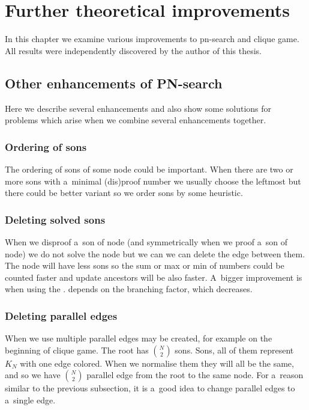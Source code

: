 \chapter{Further theoretical improvements}

In this chapter we examine various improvements to pn-search and clique
game. All results
were independently discovered by the author of this thesis.

\section{Other enhancements of PN-search} 
Here we describe several enhancements
and also show some solutions for problems which arise when we combine several
 enhancements together. 

\subsection{Ordering of sons} \label{ord}

The ordering of sons of some node could be important. When there are two or more
sons with a~minimal (dis)proof number we usually choose the leftmost but there could
be better variant so we order sons by some heuristic.

\subsection{Deleting solved sons}

When we disproof a~son of  node (and symmetrically when we proof a~son
of  node) we do not solve the node but we can we can delete the edge
between them. The node will have less sons so the sum or max or min of numbers
could be counted faster and update ancestors will be also faster. A~bigger
improvement is when using the .  depends on
the branching factor, which decreases.

\subsection{Deleting parallel edges } \label{multi-edges} 

When we use  multiple parallel edges may be
created, for example on the beginning of clique game. The root has $N \choose
2$ sons. Sons, all of them represent $K_N$ with one edge colored. When we
normalise them they will all be the same, and so we have $N \choose 2$ parallel
edge from the root to the same node. For a~reason similar to the previous
subsection, it is a~good idea to change parallel edges to a~single edge.

